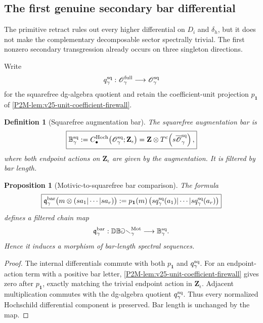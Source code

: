 \documentclass[11pt]{article}
\newtheorem{proposition}[theorem]{Proposition}
\newtheorem{definition}[theorem]{Definition}
\theoremstyle{remark}
\newcommand{\Z}{\mathbf Z}
\newcommand{\Mot}{\mathrm{Mot}}
\begin{document}
\subsection{The first genuine secondary bar differential}


The primitive retract rules out every higher differential on
\(D_i\) and \(\delta_h\), but it does not make the complementary
decomposable sector spectrally trivial.  The first nonzero secondary
transgression already occurs on three singleton directions.

Write
\[
 q_\gamma^{\rm sq}:
 \mathscr O_\gamma^{\rm full}
 \longrightarrow
 \mathscr O_\gamma^{\rm sq}
\]
for the squarefree dg-algebra quotient and retain the coefficient-unit
projection \(p_{\mathbf1}\) of
\cref{P2M-lem:v25-unit-coefficient-firewall}.

\begin{definition}[Squarefree augmentation bar]
\label{P2M-def:v26-squarefree-augmentation-bar}
The \emph{squarefree augmentation bar} is
\begin{equation}
 \boxed{
 \mathbb B_\gamma^{\rm sq}
 :=
 C_\bullet^{\rm Hoch}\!\left(
   \mathscr O_\gamma^{\rm sq};\Z_\epsilon
 \right)
 =
 \Z\otimes
 T^c\!\left(s\overline{\mathscr O}_\gamma^{\rm sq}\right),}
\end{equation}
where both endpoint actions on \(\Z_\epsilon\) are given by the augmentation.
It is filtered by bar length.
\end{definition}

\begin{proposition}[Motivic-to-squarefree bar comparison]
\label{P2M-prop:v26-motivic-squarefree-bar-comparison}
The formula
\begin{equation}
 \boxed{
 \mathfrak q_\gamma^{\rm bar}
 \bigl(
   m\otimes(sa_1|\cdots|sa_r)
 \bigr)
 :=
 p_{\mathbf1}(m)\,
 \bigl(
   s q_\gamma^{\rm sq}(a_1)|\cdots|
   s q_\gamma^{\rm sq}(a_r)
 \bigr)}
\end{equation}
defines a filtered chain map
\[
 \mathfrak q_\gamma^{\rm bar}:
 \mathbb{DBar}_\gamma^{\Mot}
 \longrightarrow
 \mathbb B_\gamma^{\rm sq}.
\]
Hence it induces a morphism of bar-length spectral sequences.
\end{proposition}

\begin{proof}
The internal differentials commute with both
\(p_{\mathbf1}\) and \(q_\gamma^{\rm sq}\).
For an endpoint-action term with a positive bar letter,
\cref{P2M-lem:v25-unit-coefficient-firewall} gives zero after
\(p_{\mathbf1}\), exactly matching the trivial endpoint action in
\(\Z_\epsilon\).  Adjacent multiplication commutes with the dg-algebra
quotient \(q_\gamma^{\rm sq}\).  Thus every normalized Hochschild
differential component is preserved.  Bar length is unchanged by the map.
\end{proof}
\end{document}
